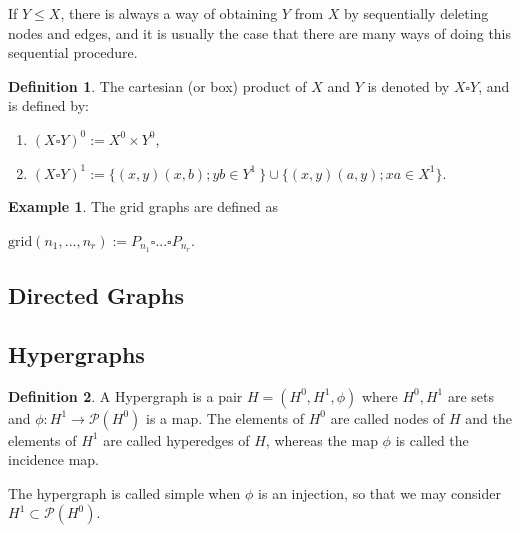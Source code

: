 \documentclass[]{article}
\theoremstyle{definition}
\newtheorem{definition}{Definition}[section]
\theoremstyle{definition}
\newtheorem{exmp}{Example}[section]
\newcommand{\raw}{\rightarrow}
\begin{document}
If $Y \leq X$, there is always a way of obtaining $Y$ from $X$ by sequentially deleting nodes and edges, and it is usually the case that there are many ways of doing this sequential procedure.


\begin{definition}
	The cartesian (or box) product of $X$ and $Y$ is denoted by $X \square Y$, and is defined by:
	
	\begin{enumerate}
		\item $(X \square Y)^0 := X^0 \times Y^0$,
		
		\item $(X \square Y)^1 := \{(x,y)(x,b); yb  \in Y^1\ \} \cup \{(x,y)(a,y); xa \in X^1\}$.
	\end{enumerate}
\end{definition}

\begin{exmp}
	The grid graphs are defined as 
	\begin{center}
		$\text{grid}(n_1, ..., n_r) := P_{n_1}\square ... \square P_{n_r}$.
	\end{center}
\end{exmp}

\subsection{Directed Graphs}


\subsection{Hypergraphs}

\begin{definition}
	A Hypergraph is a pair $H=(H^0, H^1, \phi)$ where $H^0, H^1$ are sets and $\phi: H^1 \raw \mathcal{P}(H^0)$ is a map. The elements of $H^0$ are called nodes of $H$ and the elements of $H^1$ are called hyperedges of $H$, whereas the map $\phi$ is called the incidence map.

	The hypergraph is called simple when $\phi$ is an injection, so that we may consider $H^1 \subset \mathcal{P}(H^0)$.
\end{definition}
\end{document}
